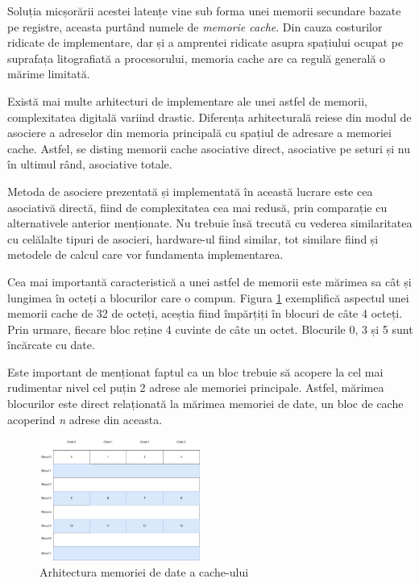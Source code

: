 \documentclass[12pt]{article}
\begin{document}
Soluția micșorării acestei latențe vine sub forma unei memorii secundare bazate pe registre, aceasta purtând numele de \textit{memorie cache}. Din cauza costurilor ridicate de implementare, dar și a amprentei ridicate asupra spațiului ocupat pe suprafața litografiată a procesorului, memoria cache are ca regulă generală o mărime limitată.

Există mai multe arhitecturi de implementare ale unei astfel de memorii, complexitatea digitală variind drastic. Diferența arhitecturală reiese din modul de asociere a adreselor din memoria principală cu spațiul de adresare a memoriei cache. Astfel, se disting memorii cache asociative direct, asociative pe seturi și nu în ultimul rând, asociative totale.

Metoda de asociere prezentată și implementată în această lucrare este cea asociativă directă, fiind de complexitatea cea mai redusă, prin comparație cu alternativele anterior menționate. Nu trebuie însă trecută cu vederea similaritatea cu celălalte tipuri de asocieri, hardware-ul fiind similar, tot similare fiind și metodele de calcul care vor fundamenta implementarea.

Cea mai importantă caracteristică a unei astfel de memorii este mărimea sa cât și lungimea în octeți a blocurilor care o compun. Figura \ref{Figura:41} exemplifică aspectul unei memorii cache de 32 de octeți, aceștia fiind împărțiți în blocuri de câte 4 octeți. Prin urmare, fiecare bloc reține 4 cuvinte de câte un octet. Blocurile 0, 3 și 5 sunt încărcate cu date.

 Este important de menționat faptul ca un bloc trebuie să acopere la cel mai rudimentar nivel cel puțin 2 adrese ale memoriei principale. Astfel, mărimea blocurilor este direct relaționată la mărimea memoriei de date, un bloc de cache acoperind \textit{n} adrese din aceasta.

 \begin{figure}[h!]
 \includegraphics[width=0.47\textwidth]{cache.pdf}
 \centering
 \caption{Arhitectura memoriei de date a cache-ului}
 \label{Figura:41}
 \end{figure}
 
\end{document}
